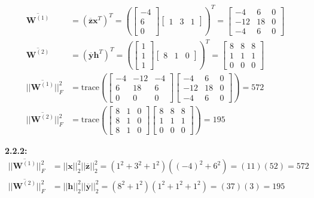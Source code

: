 \documentclass[12pt]{article}
\newcommand{\m}[1]{\mathbf{#1}}
\newcommand{\ol}[1]{\overline{#1}}
\begin{document}
\begin{align*}
    \ol{\m W^{(1)}} &= (\ol{\m z} \m x^T)^T = (\begin{bmatrix} -4 \\ 6 \\ 0 \end{bmatrix} \begin{bmatrix} 1 & 3 & 1 \end{bmatrix})^T = \begin{bmatrix} -4 & 6 & 0 \\ -12 & 18 & 0 \\ -4 & 6 & 0 \end{bmatrix}\\
    \ol{\m W^{(2)}} &= (\ol{\m y} \m h^T)^T = (\begin{bmatrix} 1 \\ 1 \\ 1 \end{bmatrix} \begin{bmatrix} 8 & 1 & 0 \end{bmatrix})^T = \begin{bmatrix} 8 & 8 & 8 \\ 1 & 1 & 1 \\ 0 & 0 & 0 \end{bmatrix}\\
    ||\ol{\m W^{(1)}}||^2_F &= \text{trace}(\begin{bmatrix} -4 & -12 & -4 \\ 6 & 18 & 6 \\ 0 & 0 & 0 \end{bmatrix} \begin{bmatrix} -4 & 6 & 0 \\ -12 & 18 & 0 \\ -4 & 6 & 0 \end{bmatrix}) = 572\\
    ||\ol{\m W^{(2)}}||^2_F &= \text{trace}(\begin{bmatrix} 8 & 1 & 0 \\ 8 & 1 & 0 \\ 8 & 1 & 0 \end{bmatrix} \begin{bmatrix} 8 & 8 & 8 \\ 1 & 1 & 1 \\ 0 & 0 & 0 \end{bmatrix}) = 195
\end{align*}

\textbf{2.2.2:}
\begin{align*}
    ||\ol{\m W^{(1)}}||^2_F &= ||\m x||^2_2 ||\ol{\m z}||^2_2 = (1^2 + 3^2 + 1^2)((-4)^2 + 6^2) = (11)(52) = 572\\
    ||\ol{\m W^{(2)}}||^2_F &= ||\m h||^2_2 ||\ol{\m y}||^2_2 = (8^2 + 1^2)(1^2 + 1^2 + 1^2) = (37)(3) = 195
\end{align*}
\end{document}
